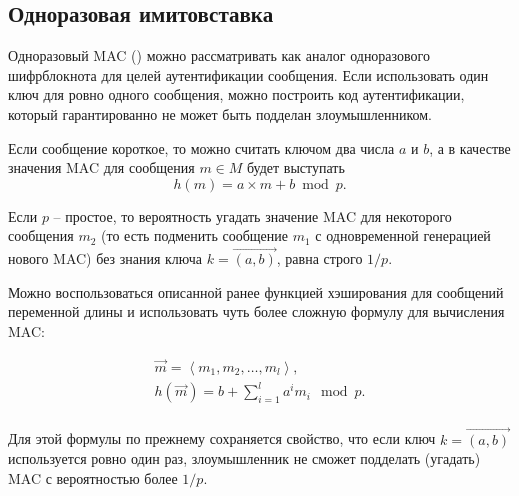\subsection{Одноразовая имитовставка}\label{sec:one-time-mac}
Одноразовый MAC () можно рассматривать как аналог одноразового шифрблокнота для целей аутентификации сообщения. Если использовать один ключ для ровно одного сообщения, можно построить код аутентификации, который гарантированно не может быть подделан злоумышленником.

Если сообщение короткое, то можно считать ключом два числа $a$ и $b$, а в качестве значения MAC для сообщения $m \in M$ будет выступать
\[
h(m) = a \times m + b \bmod p.
\]

Если $p$ -- простое, то вероятность угадать значение MAC для некоторого сообщения $m_2$ (то есть подменить сообщение $m_1$ с одновременной генерацией нового MAC) без знания ключа $k=\overrightarrow{(a,b)}$, равна строго $1/p$.

Можно воспользоваться описанной ранее функцией хэширования для сообщений переменной длины и использовать чуть более сложную формулу для вычисления MAC:

\[ \begin{array}{l}
\vec{m} = \left \langle m_1, m_2, \dots, m_l \right \rangle, \\
h(\vec{m}) = b + \sum_{i=1}^{l} a^i m_i \mod p. \\
\end{array}  \]

Для этой формулы по прежнему сохраняется свойство, что если ключ $k=\overrightarrow{(a,b)}$ используется ровно один раз, злоумышленник не сможет подделать (угадать) MAC с вероятностью более $1/p$.
